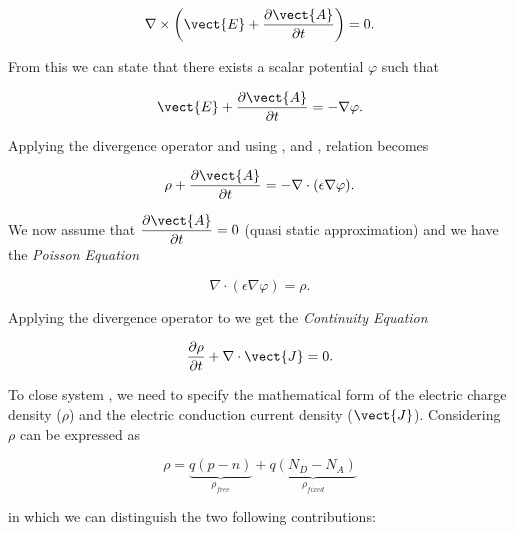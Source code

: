 \begin{equation}
\nabla \times \left( \vect{E} + \dfrac{\partial \vect{A}}{\partial t} \right) = 0.
\end{equation}

From this we can state that there exists a scalar potential $\varphi$ such that

\begin{equation}
\label{eq: potenziale scalare}
\vect{E} + \dfrac{\partial \vect{A}}{\partial t} = -\nabla \varphi.
\end{equation}


 Applying the divergence operator and using ,  and , relation  becomes

\begin{equation}
\rho + \dfrac{\partial \vect{A}}{\partial t}  = -\nabla \cdot (\epsilon \nabla \varphi).
\end{equation}

We now assume that $\dfrac{\partial \vect{A}}{\partial t} = 0$ (quasi static approximation) and we have the \textit{Poisson Equation}

\begin{equation}
\label{eq: Poisson equation}
\nabla \cdot (\epsilon \nabla \varphi) = \rho.
\end{equation} 
	
Applying the divergence operator to  we get the \textit{Continuity Equation}

\begin{equation}
\label{eq: continuity equation total}
\dfrac{\partial \rho}{\partial t} + \nabla \cdot \vect{J}  =  0. \end{equation} 


To close system  , we need to specify the mathematical form of the electric charge density ($\rho$) and the electric conduction current density ($\vect{J}$).
Considering  $\rho$ can be expressed as


\begin{equation}
\label{eq: charge balance}
\rho = \underbrace{q(p-n)}_{\rho_{free}} +\underbrace{q(N_D-N_A)}_{\rho_{fixed}}
\end{equation}

in which we can distinguish the two following contributions:


